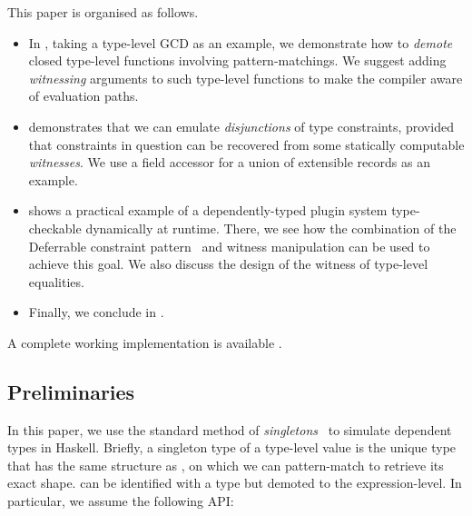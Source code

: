 \documentclass[demotion-paper.tex]{subfiles}
\begin{document}
This paper is organised as follows.
\begin{itemize}
  \item In , taking a type-level GCD as an example, we demonstrate how to \emph{demote} closed type-level functions involving pattern-matchings.
  We suggest adding \emph{witnessing} arguments to such type-level functions to make the compiler aware of evaluation paths.
  \item {} demonstrates that we can emulate \emph{disjunctions} of type constraints, provided that constraints in question can be recovered from some statically computable \emph{witnesses}.
  We use a field accessor for a union of extensible records as an example.
  \item {} shows a practical example of a dependently-typed plugin system type-checkable dynamically at runtime.
  There, we see how the combination of the Deferrable constraint pattern~\cite{Kmett:2020ab} and witness manipulation can be used to achieve this goal.
  We also discuss the design of the witness of type-level equalities.
  \item Finally, we conclude in .
\end{itemize}

A complete working implementation is available .

\subsection{Preliminaries}
In this paper, we use the standard method of \emph{singletons}~\cite{Eisenberg:2012} to simulate dependent types in Haskell.
Briefly, a singleton type  of a type-level value  is the unique type that has the same structure as , on which we can pattern-match to retrieve its exact shape.
 can be identified with a type  but demoted to the expression-level.
In particular, we assume the following API:
\end{document}
